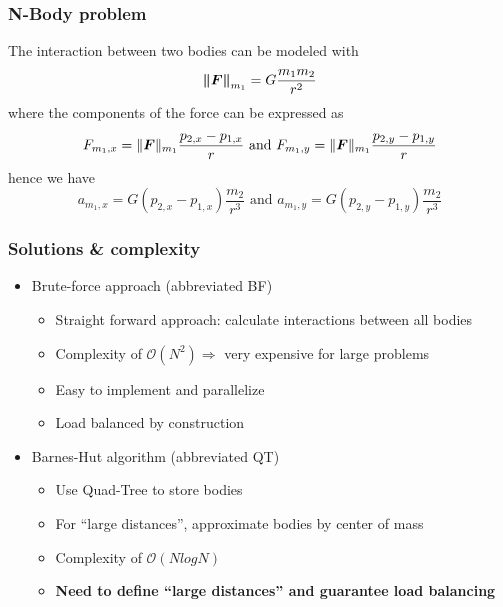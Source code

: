 \begin{frame}
  \frametitle{N-Body problem}
  The interaction between two bodies can be modeled with
  \[\boldsymbol{\lVert F\rVert}_{m_1} = G\frac{m_1m_2}{r^2}\]
  where the components of the force can be expressed as
  \[F_{m_1,x} = \lVert\boldsymbol{F}\rVert_{m_1}\frac{p_{2,x}-p_{1,x}}{r} \text{ and } F_{m_1,y} = \lVert\boldsymbol{F}\rVert_{m_1}\frac{p_{2,y}-p_{1,y}}{r}\]
  hence we have
  \[a_{m_1,x} = G(p_{2,x}-p_{1,x})\frac{m_2}{r^3} \text{ and } a_{m_1,y} = G(p_{2,y}-p_{1,y})\frac{m_2}{r^3}\]
\end{frame}

\begin{frame}
  \frametitle{Solutions \& complexity}
  \begin{itemize}
    \item Brute-force approach (abbreviated BF)
      \begin{itemize}
        \item Straight forward approach: calculate interactions between all bodies
        \item Complexity of $\mathcal{O}(N^2) \Rightarrow $ very expensive for large problems 
        \item Easy to implement and parallelize
        \item Load balanced by construction
      \end{itemize}
    \item Barnes-Hut algorithm (abbreviated QT)
      \begin{itemize}
      \item Use Quad-Tree to store bodies
      \item For ``large distances'', approximate bodies by center of mass
      \item Complexity of $\mathcal{O}(NlogN)$
      \item \textbf{Need to define ``large distances'' and guarantee load balancing}
      \end{itemize}
  \end{itemize}
\end{frame}

